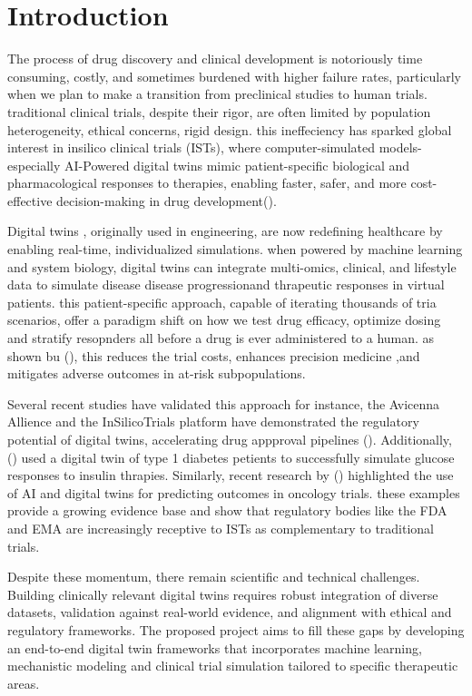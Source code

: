 \chapter*{Introduction}
The process of drug \cite{kaul2023} discovery and clinical development is notoriously time consuming, costly, and sometimes burdened
with higher failure rates, particularly when we plan to make a transition from preclinical studies to human trials. traditional clinical trials, despite their rigor, are often limited by population heterogeneity, ethical concerns, rigid design.
this ineffeciency has sparked global interest in insilico clinical trials (ISTs), where computer-simulated models-especially AI-Powered
digital twins mimic patient-specific biological and pharmacological responses to therapies, enabling faster, safer, and more cost-effective 
decision-making in drug development().

Digital twins \cite{croatti2020integration}, originally used in engineering, are now redefining healthcare by enabling real-time, individualized simulations.
when powered by machine learning and system biology, digital twins can integrate multi-omics, clinical, and lifestyle data to simulate disease disease progressionand thrapeutic responses in 
virtual patients. this patient-specific approach, capable of iterating thousands of tria scenarios, offer a paradigm shift on how we test drug efficacy, optimize dosing and stratify resopnders all before
a drug is ever administered to a human. as shown bu (), this reduces the trial costs, enhances precision medicine ,and mitigates adverse outcomes in at-risk subpopulations.

Several recent studies have validated this approach for instance, the Avicenna Allience and the InSilicoTrials platform have demonstrated the regulatory
potential of digital twins, accelerating drug appproval pipelines (). Additionally, () used a digital twin of type 1 diabetes petients to successfully 
simulate glucose responses to insulin thrapies. Similarly, recent research by () highlighted the use of AI and digital twins for predicting 
outcomes in oncology trials. these examples provide a growing evidence base and show that regulatory bodies like the FDA and EMA are increasingly receptive
to ISTs as complementary to traditional trials.

Despite these momentum,  there remain scientific and technical challenges. Building clinically relevant digital twins requires 
robust integration of diverse datasets, validation against real-world evidence, and alignment with ethical and regulatory frameworks. The proposed
project aims to fill these gaps by developing an end-to-end digital twin frameworks that incorporates machine learning, mechanistic modeling and clinical 
trial simulation tailored to specific therapeutic areas.

